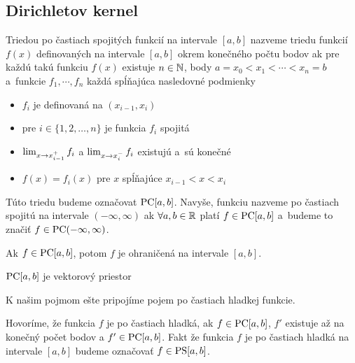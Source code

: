 
\subsection{Dirichletov kernel}
\begin{definicia}
    Triedou po častiach spojitých funkcií na intervale $[a,b]$ nazveme
    triedu funkcií $f(x)$ definovaných na intervale $[a,b]$ okrem
    konečného počtu bodov ak pre každú takú funkciu $f(x)$ 
    existuje $n\in\mathbb{N}$, body $a=x_0<x_1<\cdots<x_n=b$ a~funkcie
    $f_1, \cdots, f_n$ každá spĺňajúca nasledovné podmienky
    \begin{itemize}
        \item
            $f_i$ je definovaná na $(x_{i-1},x_i)$
        \item
            pre $i \in \{1,2,\dots,n\}$ je funkcia $f_i$ spojitá
        \item
            $\lim_{x \rightarrow x_{i-1}^+} f_i$ a 
            $\lim_{x \rightarrow x_i^-} f_i$ existujú a~sú konečné
        \item
            $f(x) = f_i(x)$ pre $x$ spĺňajúce $x_{i-1} < x < x_i$
    \end{itemize}
    Túto triedu budeme označovat $\mbox{PC}[a,b]$. Navyše, funkciu nazveme po
    častiach spojitú na intervale $(-\infty,\infty)$ ak 
    $\forall a,b \in {\mathbb R}$  platí $f\in \mbox{PC}[a,b]$
    a~budeme to značiť $f\in\mbox{PC}(-\infty,\infty)$.
\end{definicia}

\begin{lema}
    Ak $f \in \mbox{PC}[a,b]$, potom $f$ je ohraničená na intervale $[a,b]$.
    \label{lema:ohranicenost_na_pcab}
\end{lema}

\begin{lema}
    $\mbox{PC}[a,b]$ je vektorový priestor
\end{lema}
K našim pojmom ešte pripojíme pojem po častiach hladkej funkcie.
\begin{definicia}
    Hovoríme, že funkcia $f$ je po častiach hladká, ak
    $f \in \mbox{PC}[a,b]$, $f'$ existuje až na konečný počet bodov
    a $f'\in \mbox{PC}[a,b]$. Fakt že funkcia $f$ je po častiach hladká na
    intervale $[a,b]$ budeme označovať $f\in\mbox{PS}[a,b]$.
\end{definicia}

